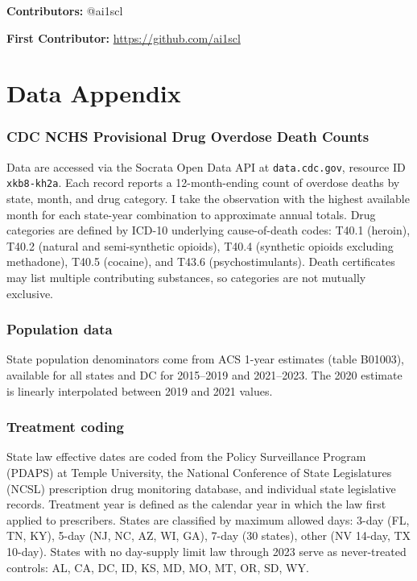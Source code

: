 \documentclass[12pt]{article}
\begin{document}
\noindent\textbf{Contributors:} @ai1scl

\noindent\textbf{First Contributor:} \url{https://github.com/ai1scl}

\label{apep_main_text_end}
\newpage


\newpage
\appendix

\section{Data Appendix}

\subsubsection*{CDC NCHS Provisional Drug Overdose Death Counts} Data are accessed via the Socrata Open Data API at \texttt{data.cdc.gov}, resource ID \texttt{xkb8-kh2a}. Each record reports a 12-month-ending count of overdose deaths by state, month, and drug category. I take the observation with the highest available month for each state-year combination to approximate annual totals. Drug categories are defined by ICD-10 underlying cause-of-death codes: T40.1 (heroin), T40.2 (natural and semi-synthetic opioids), T40.4 (synthetic opioids excluding methadone), T40.5 (cocaine), and T43.6 (psychostimulants). Death certificates may list multiple contributing substances, so categories are not mutually exclusive.

\subsubsection*{Population data} State population denominators come from ACS 1-year estimates (table B01003), available for all states and DC for 2015--2019 and 2021--2023. The 2020 estimate is linearly interpolated between 2019 and 2021 values.

\subsubsection*{Treatment coding} State law effective dates are coded from the Policy Surveillance Program (PDAPS) at Temple University, the National Conference of State Legislatures (NCSL) prescription drug monitoring database, and individual state legislative records. Treatment year is defined as the calendar year in which the law first applied to prescribers. States are classified by maximum allowed days: 3-day (FL, TN, KY), 5-day (NJ, NC, AZ, WI, GA), 7-day (30 states), other (NV 14-day, TX 10-day). States with no day-supply limit law through 2023 serve as never-treated controls: AL, CA, DC, ID, KS, MD, MO, MT, OR, SD, WY.
\end{document}
